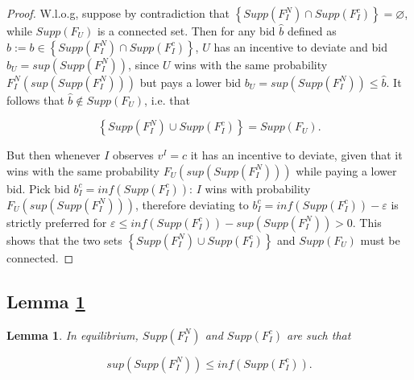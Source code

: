 \documentclass[11pt]{article}
\theoremstyle{plain}
\theoremstyle{definition}
\theoremstyle{plain}
\theoremstyle{plain}
\theoremstyle{plain}
\newtheorem{lem}[thm]{Lemma}
\theoremstyle{plain}
\numberwithin{equation}{section}
\begin{document}
\begin{proof}
    W.l.o.g, suppose by contradiction that  $\left\{ Supp\left( F_I^N \right) \cap Supp\left( F_I^c \right)\right\} = \varnothing$, while $Supp(F_U)$ is a connected set. Then for any bid $\hat{b}$ defined as $\hat{b} := b \in \left\{ Supp\left( F_I^N \right) \cap Supp\left( F_I^c \right)\right\} $, $U$ has an incentive to deviate and bid $b_U = sup(Supp(F_I^N))$, since $U$ wins with the same probability $F_I^N(sup(Supp(F_I^N)))$ but pays a lower bid $b_U = sup(Supp(F_I^N)) \leq \hat{b}$. It follows that $\hat{b} \notin Supp(F_U)$, i.e. that 

\begin{equation*}
\left\{ Supp\left( F_I^N \right) \cup Supp\left( F_I^c \right)\right\} = Supp(F_U).
\end{equation*}
\vspace{-0.2cm}

\noindent But then whenever $I$ observes $v^I = c$ it has an incentive to deviate, given that it wins with the same probability $F_U(sup(Supp(F_I^N)))$ while paying a lower bid. Pick bid $b_I^c = inf(Supp(F_I^c))$: $I$ wins with probability $F_U(sup(Supp(F_I^N)))$, therefore deviating to $b_I^c = inf(Supp(F_I^c)) - \varepsilon$ is strictly preferred for $\varepsilon \leq inf(Supp(F_I^c)) - sup(Supp(F_I^N))>0$. This shows that the two sets $\left\{ Supp\left( F_I^N \right) \cup Supp\left( F_I^c \right)\right\}$ and $Supp(F_U)$ must be connected.
\end{proof}
\vspace{3mm}

\subsection*{Lemma \ref{rankedF}}
\begin{lem}\label{rankedF}
    In equilibrium, $Supp(F_I^N)$ and $Supp(F_I^c)$ are such that
    
    \begin{equation*}
        sup\left(Supp(F_I^N)\right) \leq inf\left(Supp(F_I^c)\right).
    \end{equation*}
\end{lem}
\vspace{1mm}
\end{document}
